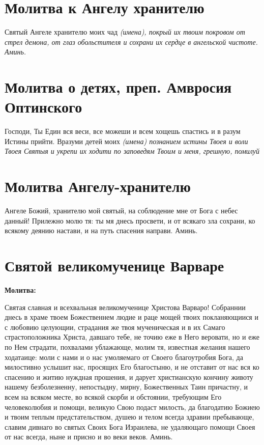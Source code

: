 \section{Молитва к Ангелу хранителю}
 





Святый Ангеле хранителю моих чад \itshape (имена)\normalfont{}, покрый их твоим покровом от стрел демона, от глаз обольстителя и сохрани их сердце в ангельской чистоте. Аминь. 





\section{Молитва о детях, преп. Амвросия Оптинского}
 


Господи, Ты Един вся веси, все можеши и всем хощешь спастись и в разум Истины прийти. Вразуми детей моих \itshape (имена)\normalfont{} познанием истины Твоея и воли Твоея Святыя и укрепи их ходити по заповедям Твоим и меня, грешную, помилуй


\section{Молитва Ангелу-хранителю}
 


Ангеле Божий, хранителю мой святый, на соблюдение мне от Бога с небес данный! Прилежно молю тя: ты мя днесь просвети, и от всякаго зла сохрани, ко всякому деянию настави, и на путь спасения направи. Аминь.


\section{Святой великомученице Варваре}
 
\bfseries Молитва:\normalfont{}


Святая славная и всехвальная великомученице Христова Варваро! Собраннии днесь в храме твоем Божественнем людие и раце мощей твоих покланяющиися и с любовию целующии, страдания же твоя мученическая и в их Самаго страстоположника Христа, давшаго тебе, не точию еже в Него веровати, но и еже по Нем страдати, похвалами ублажающе, молим тя, известная желания нашего ходатаице: моли с нами и о нас умоляемаго от Своего благоутробия Бога, да милостивно услышит нас, просящих Его благостыню, и не отставит от нас вся ко спасению и житию нуждная прошения, и дарует христианскую кончину животу нашему безболезненну, непостыдну, мирну, Божественных Таин причастну, и всем на всяком месте, во всякой скорби и обстоянии, требующим Его человеколюбия и помощи, великую Свою подаст милость, да благодатию Божиею и твоим теплым предстательством, душею и телом всегда здравии пребывающе, славим дивнаго во святых Своих Бога Израилева, не удаляющаго помощи Своея от нас всегда, ныне и присно и во веки веков. Аминь.

